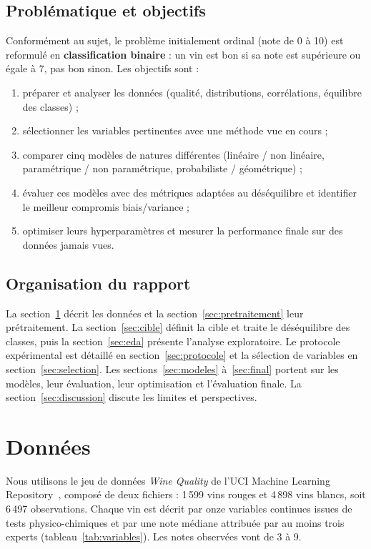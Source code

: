 \documentclass[11pt,a4paper]{article}
\begin{document}
\subsection{Problématique et objectifs}
Conformément au sujet, le problème initialement ordinal (note de 0 à 10) est reformulé en \textbf{classification binaire} : un vin est \og bon \fg{} si sa note est supérieure ou égale à 7, \og pas bon \fg{} sinon. Les objectifs sont :
\begin{enumerate}
  \item préparer et analyser les données (qualité, distributions, corrélations, équilibre des classes) ;
  \item sélectionner les variables pertinentes avec une méthode vue en cours ;
  \item comparer cinq modèles de natures différentes (linéaire / non linéaire, paramétrique / non paramétrique, probabiliste / géométrique) ;
  \item évaluer ces modèles avec des métriques adaptées au déséquilibre et identifier le meilleur compromis biais/variance ;
  \item optimiser leurs hyperparamètres et mesurer la performance finale sur des données jamais vues.
\end{enumerate}

\subsection{Organisation du rapport}
La section~\ref{sec:donnees} décrit les données et la section~\ref{sec:pretraitement} leur prétraitement. La section~\ref{sec:cible} définit la cible et traite le déséquilibre des classes, puis la section~\ref{sec:eda} présente l'analyse exploratoire. Le protocole expérimental est détaillé en section~\ref{sec:protocole} et la sélection de variables en section~\ref{sec:selection}. Les sections~\ref{sec:modeles} à~\ref{sec:final} portent sur les modèles, leur évaluation, leur optimisation et l'évaluation finale. La section~\ref{sec:discussion} discute les limites et perspectives.

\section{Données}\label{sec:donnees}

Nous utilisons le jeu de données \emph{Wine Quality} de l'UCI Machine Learning Repository~\cite{cortez2009}, composé de deux fichiers : 1\,599 vins rouges et 4\,898 vins blancs, soit 6\,497 observations. Chaque vin est décrit par onze variables continues issues de tests physico-chimiques et par une note médiane attribuée par au moins trois experts (tableau~\ref{tab:variables}). Les notes observées vont de 3 à 9.
\end{document}
